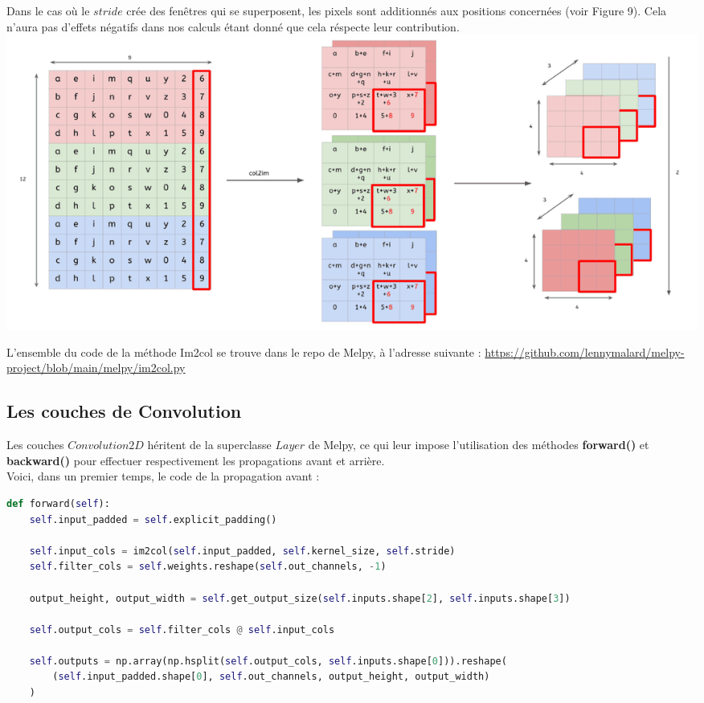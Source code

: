 \begin{multicols}{2}
Dans le cas où le $stride$ crée des fenêtres qui se superposent,
les pixels sont additionnés aux positions concernées (voir Figure 9). Cela n'aura pas 
d'effets négatifs dans nos calculs étant donné que cela réspecte leur 
contribution.\\

\includegraphics[width=\columnwidth]{images/im2col-4.png}
\hfill\break

L'ensemble du code de la méthode Im2col se trouve dans le repo de Melpy,
à l'adresse suivante : \url{https://github.com/lennymalard/melpy-project/blob/main/melpy/im2col.py}

\subsection{Les couches de Convolution}

Les couches $Convolution2D$ héritent de la superclasse $Layer$ 
de Melpy, ce qui leur impose l’utilisation des méthodes 
\textbf{forward()} et \textbf{backward()} pour effectuer 
respectivement les propagations avant et arrière.\\

Voici, dans un premier temps, le code de la propagation avant :\\

\begin{lstlisting}[language=Python]
def forward(self):
    self.input_padded = self.explicit_padding()

    self.input_cols = im2col(self.input_padded, self.kernel_size, self.stride)
    self.filter_cols = self.weights.reshape(self.out_channels, -1)

    output_height, output_width = self.get_output_size(self.inputs.shape[2], self.inputs.shape[3])

    self.output_cols = self.filter_cols @ self.input_cols

    self.outputs = np.array(np.hsplit(self.output_cols, self.inputs.shape[0])).reshape(
        (self.input_padded.shape[0], self.out_channels, output_height, output_width)
    )


\end{lstlisting}
\end{multicols}
